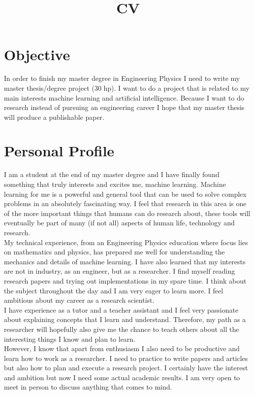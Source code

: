 \documentclass[11pt,a4paper,sans]{moderncv}        %
\title{CV}
\begin{document}
\makecvtitle
\section{Objective}
In order to finish my master degree in Engineering Physics I need to write my master thesis/degree project (30 hp). I want to do a project that is related to my main interests machine learning and artificial intelligence. Because I want to do research instead of pursuing an engineering career I hope that my master thesis will produce a publishable paper.

\section{Personal Profile}
I am a student at the end of my master degree and I have finally found something that truly interests and excites me, machine learning. Machine learning for me is a powerful and general tool that can be used to solve complex problems in an absolutely fascinating way. I feel that research in this area is one of the more important things that humans can do research about, these tools will eventually be part of many (if not all) aspects of human life, technology and research.\\

My technical experience, from an Engineering Physics education where focus lies on mathematics and physics, has prepared me well for understanding the mechanics and details of machine learning. I have also learned that my interests are not in industry, as an engineer, but as a researcher. I find myself reading research papers and trying out implementations in my spare time. I think about the subject throughout the day and I am very eager to learn more. I feel ambitious about my career as a research scientist.\\

I have experience as a tutor and a teacher assistant and I feel very passionate about explaining concepts that I learn and understand. Therefore, my path as a researcher will hopefully also give me the chance to teach others about all the interesting things I know and plan to learn. \\

However, I know that apart from enthusiasm I also need to be productive and learn how to work as a researcher. I need to practice to write papers and articles but also how to plan and execute a research project. I certainly have the interest and ambition but now I need some actual academic results. I am very open to meet in person to discuss anything that comes to mind.
\end{document}
